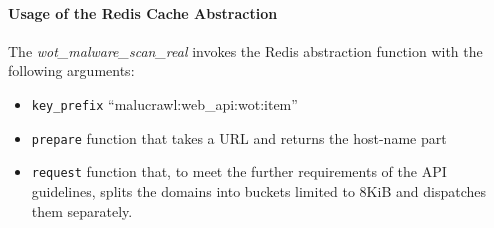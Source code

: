 \paragraph{Usage of the Redis Cache Abstraction}
The \emph{wot\_malware\_scan\_real} invokes the Redis abstraction function with the following arguments:
\begin{itemize}
    \item \verb`key_prefix` ``malucrawl:web\_api:wot:{item}''
    \item \verb`prepare` function that takes a URL and returns the host-name part
    \item \verb`request` function that, to meet the further requirements of the API guidelines, splits the domains into buckets limited to 8KiB and dispatches them separately.
\end{itemize}

